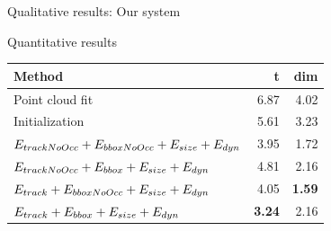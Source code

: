 \begin{frame}{Qualitative results: Our system}
  \centering
\end{frame}

\begin{frame}{Quantitative results}

  \begin{tabular}{lrr}
    \toprule
    Method & t & dim \\
    \midrule
    Point cloud fit
    & 6.87 & 4.02\\
    Initialization
    & 5.61 & 3.23\\
    $E_{trackNoOcc} + E_{bboxNoOcc} +E_{size}+E_{dyn}$ 
    & 3.95  & 1.72\\        
    $E_{trackNoOcc} + E_{bbox} +E_{size}+E_{dyn}$        
    & 4.81  & 2.16\\        
    $E_{track} + E_{bboxNoOcc} +E_{size}+E_{dyn}$      
    & 4.05  & {\bf 1.59}\\        
    $E_{track} + E_{bbox} +E_{size}+E_{dyn}$             
    & {\bf 3.24}  & 2.16\\
    \bottomrule
  \end{tabular}
  
\end{frame}

